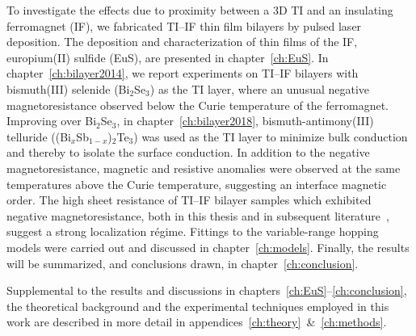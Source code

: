 To investigate the effects due to proximity between a 3D TI and an insulating ferromagnet (IF), we fabricated TI--IF thin film bilayers by pulsed laser deposition. The deposition and characterization of thin films of the IF, europium(II) sulfide (EuS), are presented in chapter~\ref{ch:EuS}. In chapter~\ref{ch:bilayer2014}, we report experiments on TI--IF bilayers with bismuth(III) selenide (Bi$_2$Se$_3$) as the TI layer, where an unusual negative magnetoresistance observed below the Curie temperature of the ferromagnet. Improving over Bi$_2$Se$_3$, in chapter~\ref{ch:bilayer2018}, bismuth-antimony(III) telluride ((Bi$_x$Sb$_{1-x}$)$_2$Te$_3$) was used as the TI layer to minimize bulk conduction and thereby to isolate the surface conduction. In addition to the negative magnetoresistance, magnetic and resistive anomalies were observed at the same temperatures above the Curie temperature, suggesting an interface magnetic order. The high sheet resistance of TI--IF bilayer samples which exhibited negative magnetoresistance, both in this thesis and in subsequent literature~\cite{Samarth2017, Tian2016}, suggest a strong localization r\'egime. Fittings to the variable-range hopping models were carried out and discussed in chapter~\ref{ch:models}. Finally, the results will be summarized, and conclusions drawn, in chapter~\ref{ch:conclusion}.

Supplemental to the results and discussions in chapters~\ref{ch:EuS}--\ref{ch:conclusion}, the theoretical background and the experimental techniques employed in this work are described in more detail in appendices~\ref{ch:theory}~\&~\ref{ch:methods}.